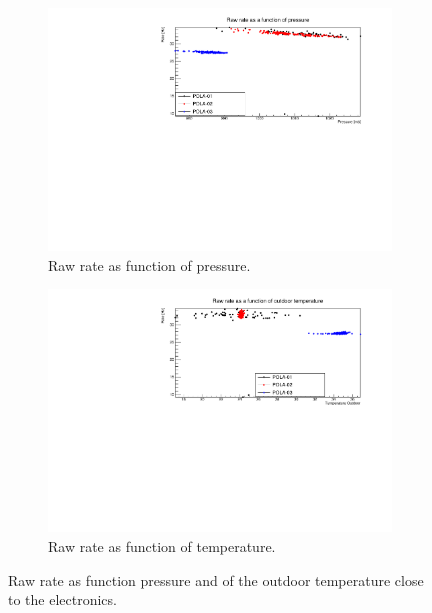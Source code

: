 \documentclass[12pt,a4paper]{amsart}
\begin{document}
\begin{figure}
\centering
	\begin{subfigure}[b]{0.6\textwidth}
	\centering
		\includegraphics[width=\textwidth]{../data/plots/RawRate_pressure_all.pdf}
		\caption{Raw rate as function of pressure.}
		\label{fig:RawRate_pressure}
	\end{subfigure}%
	\begin{subfigure}[b]{0.6\textwidth}
	\centering
		\includegraphics[width=\textwidth]{../data/plots/RawRate_OutdoorTemp_all.pdf}
		\caption{Raw rate as function of temperature.}
		\label{fig:RawRate_OutdoorTemp}
	\end{subfigure}
	\caption{Raw rate as function pressure and of the outdoor temperature close to the electronics.}
	\label{fig:rawrate_pressure_temp}
\end{figure}
\end{document}
